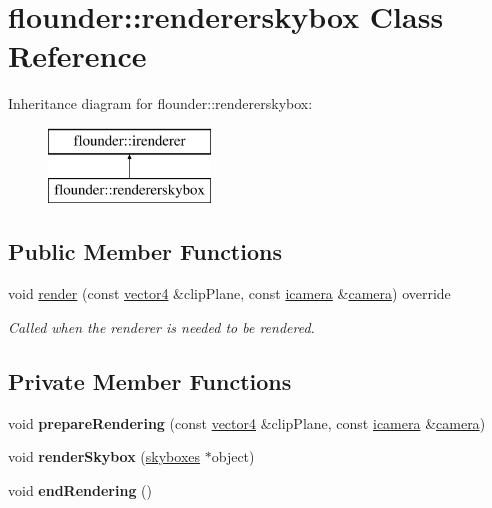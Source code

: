 \hypertarget{classflounder_1_1rendererskybox}{}\section{flounder\+:\+:rendererskybox Class Reference}
\label{classflounder_1_1rendererskybox}
Inheritance diagram for flounder\+:\+:rendererskybox\+:\begin{figure}[H]
\begin{center}
\leavevmode
\includegraphics[height=2.000000cm]{classflounder_1_1rendererskybox}
\end{center}
\end{figure}
\subsection*{Public Member Functions}
\begin{DoxyCompactItemize}
\item 
void \hyperlink{classflounder_1_1rendererskybox_a66714b2e580cd64a30e92d78a0260a33}{render} (const \hyperlink{classflounder_1_1vector4}{vector4} \&clip\+Plane, const \hyperlink{classflounder_1_1icamera}{icamera} \&\hyperlink{classflounder_1_1camera}{camera}) override
\begin{DoxyCompactList}\small\item\em Called when the renderer is needed to be rendered. \end{DoxyCompactList}\end{DoxyCompactItemize}
\subsection*{Private Member Functions}
\begin{DoxyCompactItemize}
\item 
\mbox{\label{classflounder_1_1rendererskybox_ab97d9e1bb8fb50c979fa7a2972080649}} 
void {\bfseries prepare\+Rendering} (const \hyperlink{classflounder_1_1vector4}{vector4} \&clip\+Plane, const \hyperlink{classflounder_1_1icamera}{icamera} \&\hyperlink{classflounder_1_1camera}{camera})
\item 
\mbox{\label{classflounder_1_1rendererskybox_a81290feb15d209f3d31f78176c1ca6ab}} 
void {\bfseries render\+Skybox} (\hyperlink{classflounder_1_1skyboxes}{skyboxes} $\ast$object)
\item 
\mbox{\label{classflounder_1_1rendererskybox_a41c9f505d6cf79231b67ad2f1b4a0298}} 
void {\bfseries end\+Rendering} ()
\end{DoxyCompactItemize}
